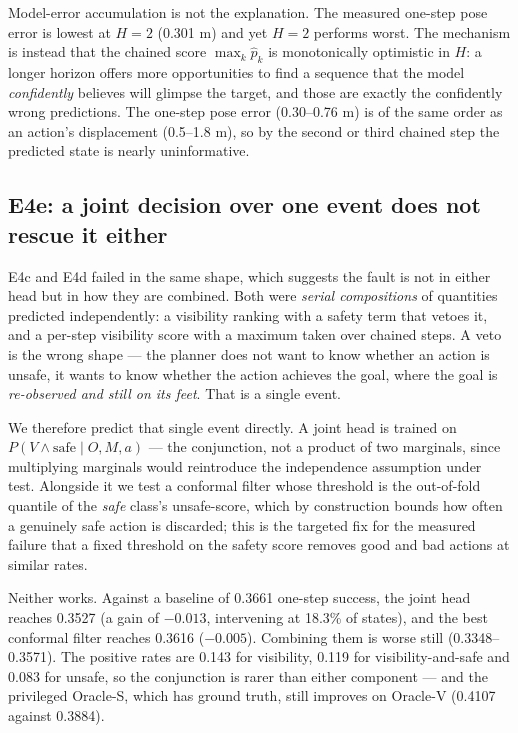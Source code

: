 \documentclass[utf8]{FrontiersinHarvard}
\begin{document}
Model-error accumulation is not the explanation. The measured one-step pose error is
lowest at $H=2$ (0.301 m) and yet $H=2$ performs worst. The mechanism is instead that
the chained score $\max_k \hat p_k$ is monotonically optimistic in $H$: a longer horizon
offers more opportunities to find a sequence that the model \emph{confidently} believes
will glimpse the target, and those are exactly the confidently wrong predictions. The
one-step pose error (0.30--0.76 m) is of the same order as an action's displacement
(0.5--1.8 m), so by the second or third chained step the predicted state is nearly
uninformative.

\subsection{E4e: a joint decision over one event does not rescue it either}


E4c and E4d failed in the same shape, which suggests the fault is not in either head
but in how they are combined. Both were \emph{serial compositions} of quantities
predicted independently: a visibility ranking with a safety term that vetoes it, and a
per-step visibility score with a maximum taken over chained steps. A veto is the wrong
shape --- the planner does not want to know whether an action is unsafe, it wants to
know whether the action achieves the goal, where the goal is \emph{re-observed and
still on its feet}. That is a single event.

We therefore predict that single event directly. A joint head is trained on
$P(V \wedge \text{safe} \mid O,M,a)$ --- the conjunction, not a product of two
marginals, since multiplying marginals would reintroduce the independence assumption
under test. Alongside it we test a conformal filter whose threshold is the out-of-fold
quantile of the \emph{safe} class's unsafe-score, which by construction bounds how often
a genuinely safe action is discarded; this is the targeted fix for the measured failure
that a fixed threshold on the safety score removes good and bad actions at similar
rates.

Neither works. Against a baseline of 0.3661 one-step success, the joint head reaches
0.3527 (a gain of $-0.013$, intervening at 18.3\% of states), and the best conformal
filter reaches 0.3616 ($-0.005$). Combining them is worse still (0.3348--0.3571). The
positive rates are 0.143 for visibility, 0.119 for visibility-and-safe and 0.083 for
unsafe, so the conjunction is rarer than either component --- and the privileged
Oracle-S, which has ground truth, still improves on Oracle-V (0.4107 against 0.3884).
\end{document}
